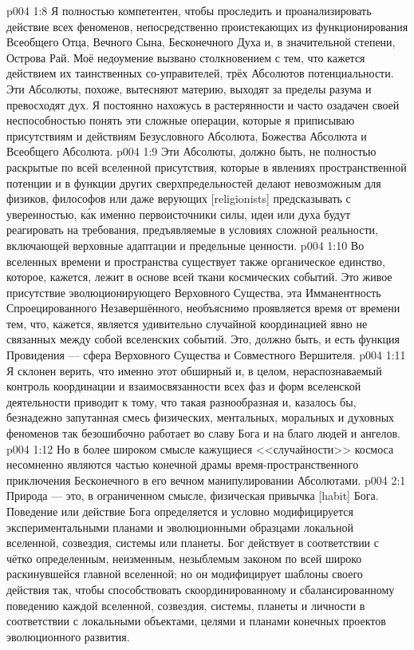 \vs p004 1:8 Я полностью компетентен, чтобы проследить и проанализировать действие всех феноменов, непосредственно проистекающих из функционирования Всеобщего Отца, Вечного Сына, Бесконечного Духа и, в значительной степени, Острова Рай. Моё недоумение вызвано столкновением с тем, что кажется действием их таинственных со\hyp{}управителей, трёх Абсолютов потенциальности. Эти Абсолюты, похоже, вытесняют материю, выходят за пределы разума и превосходят дух. Я постоянно нахожусь в растерянности и часто озадачен своей неспособностью понять эти сложные операции, которые я приписываю присутствиям и действиям Безусловного Абсолюта, Божества Абсолюта и Всеобщего Абсолюта.
\vs p004 1:9 Эти Абсолюты, должно быть, не полностью раскрытые по всей вселенной присутствия, которые в явлениях пространственной потенции и в функции других сверхпредельностей делают невозможным для физиков, философов или даже верующих [religionists] предсказывать с уверенностью, к\'ак именно первоисточники силы, идеи или духа будут реагировать на требования, предъявляемые в условиях сложной реальности, включающей верховные адаптации и предельные ценности.
\vs p004 1:10 \pc Во вселенных времени и пространства существует также органическое единство, которое, кажется, лежит в основе всей ткани космических событий. Это живое присутствие эволюционирующего Верховного Существа, эта Имманентность Спроецированного Незавершённого, необъяснимо проявляется время от времени тем, что, кажется, является удивительно случайной координацией явно не связанных между собой вселенских событий. Это, должно быть, и есть функция Провидения --- сфера Верховного Существа и Совместного Вершителя.
\vs p004 1:11 Я склонен верить, что именно этот обширный и, в целом, нераспознаваемый контроль координации и взаимосвязанности всех фаз и форм вселенской деятельности приводит к тому, что такая разнообразная и, казалось бы, безнадежно запутанная смесь физических, ментальных, моральных и духовных феноменов так безошибочно работает во славу Бога и на благо людей и ангелов.
\vs p004 1:12 Но в более широком смысле кажущиеся <<случайности>> космоса несомненно являются частью конечной драмы время\hyp{}пространственного приключения Бесконечного в его вечном манипулировании Абсолютами.
\vs p004 2:1 Природа --- это, в ограниченном смысле, физическая привычка [habit] Бога. Поведение или действие Бога определяется и условно модифицируется экспериментальными планами и эволюционными образцами локальной вселенной, созвездия, системы или планеты. Бог действует в соответствии с чётко определенным, неизменным, незыблемым законом по всей широко раскинувшейся главной вселенной; но он модифицирует шаблоны своего действия так, чтобы способствовать скоординированному и сбалансированному поведению каждой вселенной, созвездия, системы, планеты и личности в соответствии с локальными объектами, целями и планами конечных проектов эволюционного развития.
